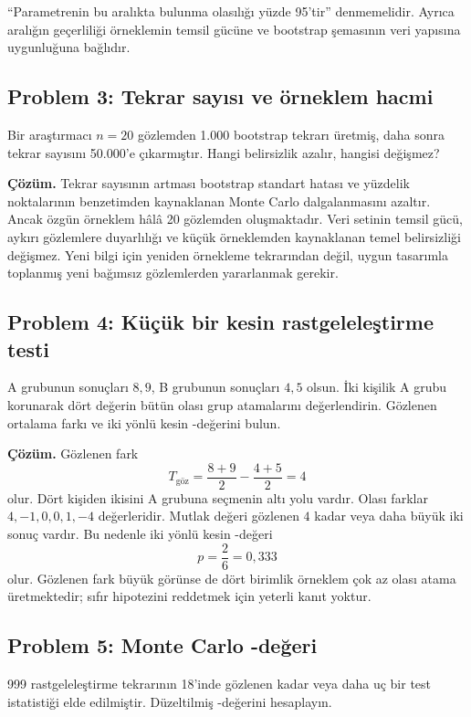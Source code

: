 ``Parametrenin bu aralıkta bulunma olasılığı yüzde 95'tir'' denmemelidir.
Ayrıca aralığın geçerliliği örneklemin temsil gücüne ve bootstrap şemasının
veri yapısına uygunluğuna bağlıdır.

\subsection*{Problem 3: Tekrar sayısı ve örneklem hacmi}

Bir araştırmacı $n=20$ gözlemden 1.000 bootstrap tekrarı üretmiş, daha sonra
tekrar sayısını 50.000'e çıkarmıştır. Hangi belirsizlik azalır, hangisi
değişmez?

\textbf{Çözüm.} Tekrar sayısının artması bootstrap standart hatası ve yüzdelik
noktalarının benzetimden kaynaklanan Monte Carlo dalgalanmasını azaltır.
Ancak özgün örneklem hâlâ 20 gözlemden oluşmaktadır. Veri setinin temsil
gücü, aykırı gözlemlere duyarlılığı ve küçük örneklemden kaynaklanan temel
belirsizliği değişmez. Yeni bilgi için yeniden örnekleme tekrarından değil,
uygun tasarımla toplanmış yeni bağımsız gözlemlerden yararlanmak gerekir.

\subsection*{Problem 4: Küçük bir kesin rastgeleleştirme testi}

A grubunun sonuçları $8,9$, B grubunun sonuçları $4,5$ olsun. İki kişilik A
grubu korunarak dört değerin bütün olası grup atamalarını değerlendirin.
Gözlenen ortalama farkı ve iki yönlü kesin \pval-değerini bulun.

\textbf{Çözüm.} Gözlenen fark
\[
T_{\text{göz}}=\frac{8+9}{2}-\frac{4+5}{2}=4
\]
olur. Dört kişiden ikisini A grubuna seçmenin altı yolu vardır. Olası farklar
$4,-1,0,0,1,-4$ değerleridir. Mutlak değeri gözlenen $4$ kadar veya daha büyük
iki sonuç vardır. Bu nedenle iki yönlü kesin \pval-değeri
\[
p=\frac{2}{6}=0{,}333
\]
olur. Gözlenen fark büyük görünse de dört birimlik örneklem çok az olası
atama üretmektedir; sıfır hipotezini reddetmek için yeterli kanıt yoktur.

\subsection*{Problem 5: Monte Carlo \pval-değeri}

999 rastgeleleştirme tekrarının 18'inde gözlenen kadar veya daha uç bir test
istatistiği elde edilmiştir. Düzeltilmiş \pval-değerini hesaplayın.


